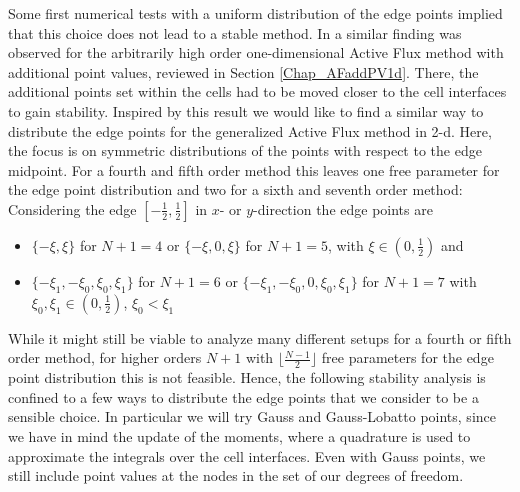 \documentclass[12pt,a4paper]{article}
\begin{document}
Some first numerical tests with a uniform distribution of the edge points implied that this choice does not lead to a stable method. In \cite{AB2023ExtensionAF} a similar finding was observed for the arbitrarily high order one-dimensional Active Flux method with additional point values, reviewed in Section \ref{Chap_AFaddPV1d}. There, the additional points set within the cells had to be moved closer to the cell interfaces to gain stability. 
Inspired by this result we would like to find a similar way to distribute the edge points for the generalized Active Flux method in 2-d. 
Here, the focus is on symmetric distributions of the points with respect to the edge midpoint. For a fourth and fifth order method this leaves one free parameter for the edge point distribution and two for a sixth and seventh order method: Considering the edge \([-\frac12, \frac12]\) in $x$- or $y$-direction the edge points are 
\begin{itemize}
\item \(\{-\xi,\xi\}\) for \(N+1=4\) or \(\{-\xi, 0,\xi\}\) for \(N+1=5\), with \(\xi \in (0,\frac12)\) and 
\item \(\{-\xi_1, -\xi_0, \xi_0, \xi_1\}\) for \(N+1=6\) or \(\{-\xi_1, -\xi_0, 0, \xi_0, \xi_1\}\) for \(N+1=7\) with \(\xi_0, \xi_1 \in (0,\frac12)\), \(\xi_0 <\xi_1\)
\end{itemize}
While it might still be viable to analyze many different setups for a fourth or fifth order method, for higher orders \(N+1\) with \(\lfloor \tfrac{N-1}{2}\rfloor\) free parameters for the edge point distribution this is not feasible. Hence, the following stability analysis is confined to a few ways to distribute the edge points that we consider to be a sensible choice.
In particular we will try Gauss and Gauss-Lobatto points, since we have in mind the update of the moments, where a quadrature is used to approximate the integrals over the cell interfaces. Even with Gauss points, we still include point values at the nodes in the set of our degrees of freedom.\\
\end{document}
